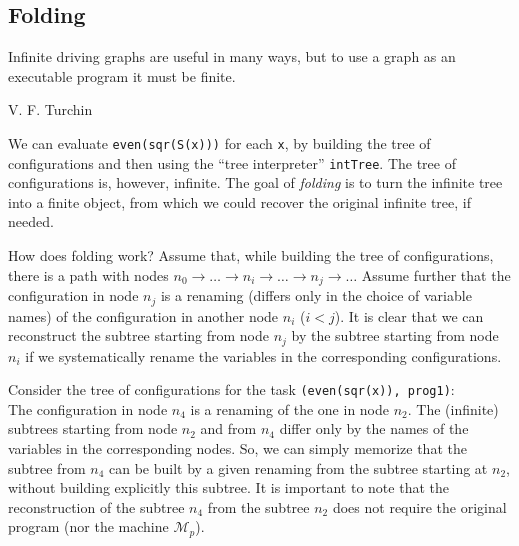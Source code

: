 
\subsection{Folding}
\epigraph{Infinite driving graphs are useful in many ways, but to use a graph as an executable program it must be finite.}
{V. F. Turchin \cite{Turchin1986ProgramTrans}}
We can evaluate \texttt{even(sqr(S(x)))} for each \texttt{x}, by building the tree of configurations
and then using the ``tree interpreter'' \texttt{intTree}. 
The tree of configurations is, however, infinite.
The goal of \emph{folding} is to turn the infinite tree into a finite object,
from which we could recover the original infinite tree, if needed.

How does folding work?
Assume that, while building the tree of configurations, there is a path with nodes
$n_0 \rightarrow \ldots \rightarrow n_i \rightarrow \ldots \rightarrow n_j
\rightarrow \ldots$
Assume further that the configuration in node $n_j$ is a renaming (differs only in the choice
of variable names) of the configuration in another node $n_i$ ($i < j$). 
It is clear that we can reconstruct the subtree starting from node $n_j$
by the subtree starting from node $n_i$ if
we systematically rename the variables in the corresponding configurations.

Consider the tree of configurations for the task \texttt{(even(sqr(x)), prog1)}: \\


The configuration in node $n_4$ is a renaming of the one in node $n_2$.
The (infinite) subtrees starting from node $n_2$ and from $n_4$ differ only by the
names of the variables in the corresponding nodes.
So, we can simply memorize that the subtree from $n_4$ can be built by
a given renaming from the subtree starting at $n_2$, 
without building explicitly this subtree.
It is important to note that the reconstruction of the subtree
$n_4$ from the subtree $n_2$ does not require the original program (nor the machine $\mathcal{M}_p$).

